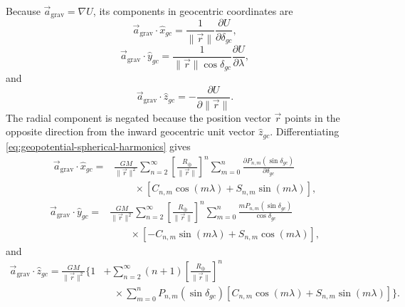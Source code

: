Because $\vec a_{\mathrm{grav}}=\nabla U$, its components in geocentric coordinates
are
\begin{equation}
  \vec a_{\mathrm{grav}}\mathbin{\cdot}\hat x_{gc}
  =\frac{1}{\lVert\vec r\rVert}
   \frac{\partial U}{\partial\delta_{gc}},
  \label{eq:gravity-geocentric-x-gradient}
\end{equation}
\begin{equation}
  \vec a_{\mathrm{grav}}\mathbin{\cdot}\hat y_{gc}
  =\frac{1}{\lVert\vec r\rVert\cos\delta_{gc}}
   \frac{\partial U}{\partial\lambda},
  \label{eq:gravity-geocentric-y-gradient}
\end{equation}
and
\begin{equation}
  \vec a_{\mathrm{grav}}\mathbin{\cdot}\hat z_{gc}
  =-\frac{\partial U}{\partial\lVert\vec r\rVert}.
  \label{eq:gravity-geocentric-z-gradient}
\end{equation}
The radial component is negated because the position vector $\vec r$ points in the
opposite direction from the inward geocentric unit vector $\hat z_{gc}$.
Differentiating \cref{eq:geopotential-spherical-harmonics} gives
\begin{equation}
  \begin{aligned}
  \vec a_{\mathrm{grav}}\mathbin{\cdot}\hat x_{gc}
  ={}&\frac{GM}{\lVert\vec r\rVert^2}
  \sum_{n=2}^{\infty}
  \left[\frac{R_{\oplus}}{\lVert\vec r\rVert}\right]^n
  \sum_{m=0}^{n}
  \frac{\partial P_{n,m}(\sin\delta_{gc})}{\partial\delta_{gc}}\\[-0.2em]
  &\qquad\times
  \left[C_{n,m}\cos(m\lambda)+S_{n,m}\sin(m\lambda)\right],
  \end{aligned}
  \label{eq:gravity-full-geocentric-x}
\end{equation}
\begin{equation}
  \begin{aligned}
  \vec a_{\mathrm{grav}}\mathbin{\cdot}\hat y_{gc}
  ={}&\frac{GM}{\lVert\vec r\rVert^2}
  \sum_{n=2}^{\infty}
  \left[\frac{R_{\oplus}}{\lVert\vec r\rVert}\right]^n
  \sum_{m=0}^{n}
  \frac{mP_{n,m}(\sin\delta_{gc})}{\cos\delta_{gc}}\\[-0.2em]
  &\qquad\times
  \left[-C_{n,m}\sin(m\lambda)+S_{n,m}\cos(m\lambda)\right],
  \end{aligned}
  \label{eq:gravity-full-geocentric-y}
\end{equation}
and
\begin{equation}
  \begin{aligned}
  \vec a_{\mathrm{grav}}\mathbin{\cdot}\hat z_{gc}
  =\frac{GM}{\lVert\vec r\rVert^2}
  \Bigg\{1
  &+\sum_{n=2}^{\infty}(n+1)
    \left[\frac{R_{\oplus}}{\lVert\vec r\rVert}\right]^n\\[-0.2em]
  &\quad\times\sum_{m=0}^{n}P_{n,m}(\sin\delta_{gc})
    \left[C_{n,m}\cos(m\lambda)+S_{n,m}\sin(m\lambda)\right]
  \Bigg\}.
  \end{aligned}
  \label{eq:gravity-full-geocentric-z}
\end{equation}

